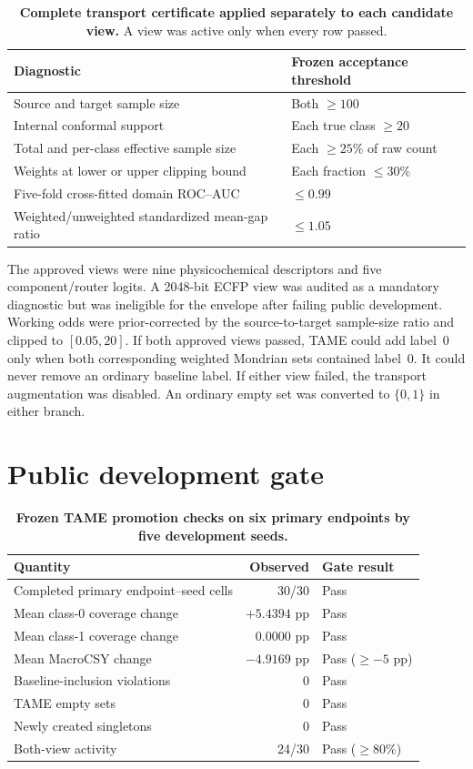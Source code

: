 \documentclass[10pt]{article}
\begin{document}
\begin{table}[!htbp]
\centering
\caption{\textbf{Complete transport certificate applied separately to each candidate view.} A view was active only when every row passed.}
\small
\begin{tabular}{p{}p{}}
\toprule
Diagnostic & Frozen acceptance threshold \\
\midrule
Source and target sample size & Both $\geq100$ \\
Internal conformal support & Each true class $\geq20$ \\
Total and per-class effective sample size & Each $\geq25\%$ of raw count \\
Weights at lower or upper clipping bound & Each fraction $\leq30\%$ \\
Five-fold cross-fitted domain ROC--AUC & $\leq0.99$ \\
Weighted/unweighted standardized mean-gap ratio & $\leq1.05$ \\
\bottomrule
\end{tabular}
\end{table}

The approved views were nine physicochemical descriptors and five component/router logits. A 2048-bit ECFP view was audited as a mandatory diagnostic but was ineligible for the envelope after failing public development. Working odds were prior-corrected by the source-to-target sample-size ratio and clipped to $[0.05,20]$. If both approved views passed, TAME could add label~0 only when both corresponding weighted Mondrian sets contained label~0. It could never remove an ordinary baseline label. If either view failed, the transport augmentation was disabled. An ordinary empty set was converted to $\{0,1\}$ in either branch.

\section{Public development gate}

\begin{table}[!htbp]
\centering
\caption{\textbf{Frozen TAME promotion checks on six primary endpoints by five development seeds.}}
\small
\begin{tabular}{lrl}
\toprule
Quantity & Observed & Gate result \\
\midrule
Completed primary endpoint--seed cells & 30/30 & Pass \\
Mean class-0 coverage change & $+5.4394$ pp & Pass \\
Mean class-1 coverage change & $0.0000$ pp & Pass \\
Mean MacroCSY change & $-4.9169$ pp & Pass ($\geq-5$ pp) \\
Baseline-inclusion violations & 0 & Pass \\
TAME empty sets & 0 & Pass \\
Newly created singletons & 0 & Pass \\
Both-view activity & 24/30 & Pass ($\geq80\%$) \\
\bottomrule
\end{tabular}
\end{table}
\end{document}
